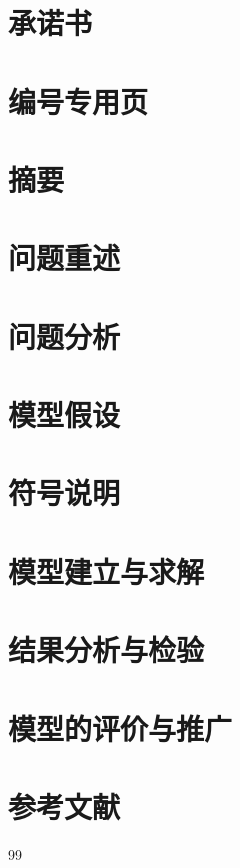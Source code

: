 \documentclass[a4paper,12pt]{ctexart}
\newcommand{\startmainnumbering}{\clearpage\setcounter{page}{1}\pagestyle{mainmatter}}
\begin{document}
\section*{承诺书}

\section*{编号专用页}

\startmainnumbering
\section*{摘要}

\section{问题重述}
\section{问题分析}
\section{模型假设}
\section{符号说明}
\section{模型建立与求解}
\section{结果分析与检验}
\section{模型的评价与推广}
\section{参考文献}
\begin{thebibliography}{99}
\end{thebibliography}
\end{document}
